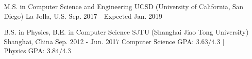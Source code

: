 


\begin{cventries}


\cventryB
{M.S. in Computer Science and Engineering} %
{UCSD (University of California, San Diego)} %
{La Jolla, U.S.} %
{Sep. 2017 - Expected Jan. 2019} %
{}


\cventry
{B.S. in Physics, B.E. in Computer Science} %
{SJTU (Shanghai Jiao Tong University)} %
{Shanghai, China} %
{Sep. 2012 - Jun. 2017} %
{Computer Science GPA: 3.63/4.3 \hspace{.1cm} | \hspace{.1cm} Physics GPA: 3.84/4.3}


\end{cventries}

